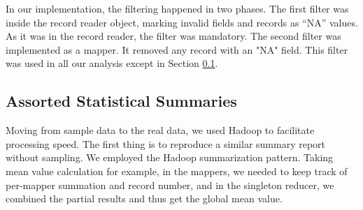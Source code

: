 \documentclass[12pt,a4paper]{article}
\begin{document}
  In our implementation, the filtering happened in two phases. The first filter was inside the record reader object, marking invalid fields and records as ``NA'' values. As it was in the record reader, the filter was mandatory. The second filter was implemented as a mapper. It removed any record with an "NA" field. This filter was used in all our analysis except in Section \ref{sec:assortedsummary}.

  \subsection{Assorted Statistical Summaries}
  \label{sec:assortedsummary}
  Moving from sample data to the real data, we used Hadoop to facilitate processing speed. The first thing is to reproduce a similar summary report without sampling. We employed the Hadoop summarization pattern. Taking mean value calculation for example, in the mappers, we needed to keep track of per-mapper summation and record number, and in the singleton reducer, we combined the partial results and thus get the global mean value. 
\end{document}
